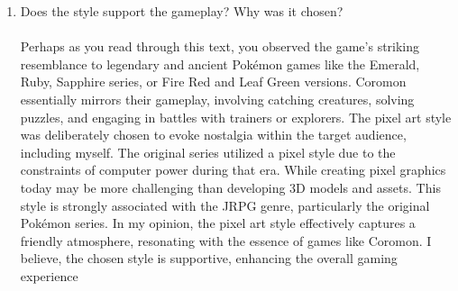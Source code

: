 \documentclass[a4paper,10pt,english]{article}
\begin{document}
\begin{enumerate}
    \item Does the style support the gameplay? Why was it chosen?\\\\  Perhaps as you read through this text, you observed the game's striking resemblance to legendary and ancient Pokémon games like the Emerald, Ruby, Sapphire series, or Fire Red and Leaf Green versions. Coromon essentially mirrors their gameplay, involving catching creatures, solving puzzles, and engaging in battles with trainers or explorers. The pixel art style was deliberately chosen to evoke nostalgia within the target audience, including myself. The original series utilized a pixel style due to the constraints of computer power during that era. While creating pixel graphics today may be more challenging than developing 3D models and assets. This style is strongly associated with the JRPG genre, particularly the original Pokémon series. In my opinion, the pixel art style effectively captures a friendly atmosphere, resonating with the essence of games like Coromon. I believe, the chosen style is supportive, enhancing the overall gaming experience
\end{enumerate}
\end{document}
